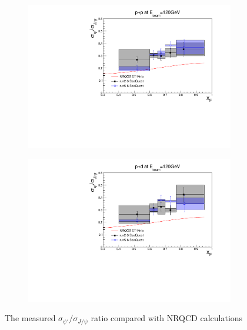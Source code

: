 \documentclass[reprint,aps,unsortedaddress,superscriptaddress,prd,floatfix,showpacs,linenumbers]{revtex4-2}
\begin{document}

\begin{figure}[h]
	\begin{subfigure}{0.45\linewidth}
		\includegraphics[width=\linewidth]{figures/crossSections/xF/ratio_xF_LH2_5-6_5770}
	\end{subfigure}
	\begin{subfigure}{0.45\linewidth}
		\includegraphics[width=\linewidth]{figures/crossSections/xF/ratio_xF_LD2_5-6_5770}
	\end{subfigure}
	\caption{The measured $\sigma_{\psi'}/\sigma_{J/\psi}$ ratio compared with NRQCD calculations}
	\label{fig:psip_jpsi_ratio_xF}
\end{figure}
\end{document}
